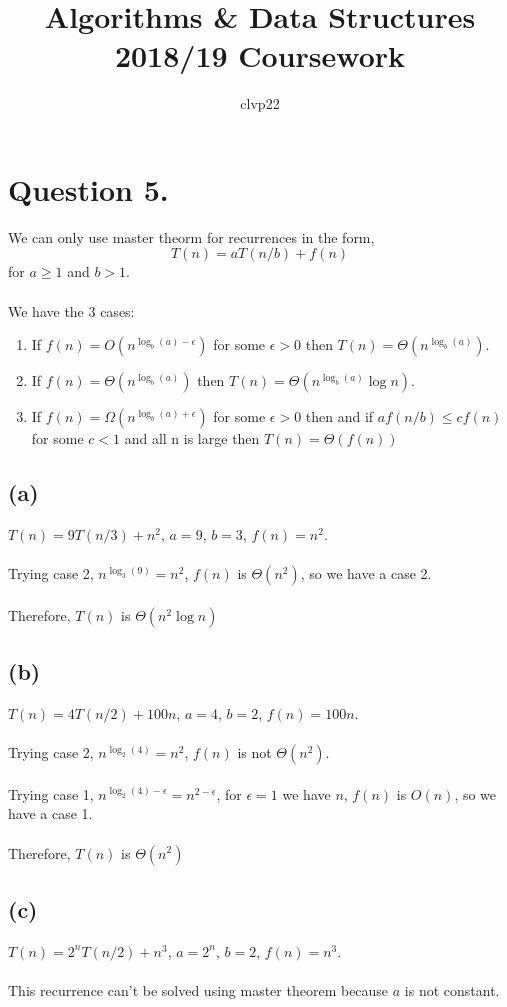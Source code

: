 \documentclass[]{article}
\title{Algorithms \& Data Structures 2018/19 Coursework}
\author{clvp22}
\begin{document}
\maketitle

\section*{Question 5.}

We can only use master theorm for recurrences in the form,
\\
$$T(n) = aT(n/b)+f(n)$$
for $a \geq 1$ and $b > 1$.
\\
\\
We have the 3 cases:
\begin{enumerate}
\item If $f(n) = O(n^{\log_b (a) - \epsilon})$ for some $\epsilon > 0$ then $T(n) = \Theta (n^{\log_b (a)})$.
\item If $f(n) = \Theta (n^{\log_b (a)})$ then $T(n) =\Theta (n^{\log_b (a)} \log n)$.
\item If $f(n) = \Omega (n^{\log_b (a) + \epsilon})$ for some $\epsilon > 0$ then and if $af(n/b) \leq cf(n)$ for some $c <1$ and all n is large then $T(n) = \Theta (f(n))$
\end{enumerate}
\subsection*{(a)}
$T(n) = 9T(n/3) + n^2$, $a=9$, $b=3$, $f(n) = n^2$.
\\
\\
Trying case 2, $n^{\log_3 (9)} = n^2$, $f(n)$ is $\Theta (n^2)$, so we have a case 2.
\\
\\
Therefore, $T(n)$ is $\Theta (n^2 \log n)$
\subsection*{(b)}
$T(n) = 4T(n/2) + 100n$, $a=4$, $b=2$, $f(n) = 100n$.
\\
\\
Trying case 2, $n^{\log_2 (4)} = n^2$, $f(n)$ is not $\Theta (n^2)$.
\\
\\
Trying case 1, $n^{\log_2 (4) - \epsilon} = n^{2 -\epsilon}$, for $\epsilon = 1$ we have $n$, $f(n)$ is $O(n)$, so we have a case 1.
\\
\\
Therefore, $T(n)$ is $\Theta (n^2)$
\subsection*{(c)}
$T(n) = 2^nT(n/2) + n^3$, $a=2^n$, $b=2$, $f(n) = n^3$.
\\
\\
This recurrence can't be solved using master theorem because $a$ is not constant.
\end{document}
